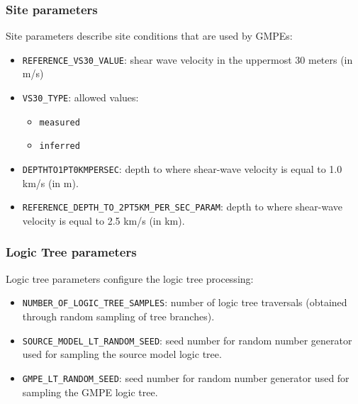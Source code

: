\subsubsection{Site parameters}
Site parameters describe site conditions that are used by GMPEs:
\begin{itemize}
\item \Verb+REFERENCE_VS30_VALUE+: shear wave velocity in the uppermost 30 meters (in m/s)
\item \Verb+VS30_TYPE+: allowed values:
\begin{itemize}
\item \Verb+measured+
\item \Verb+inferred+
\end{itemize}
\item \Verb+DEPTHTO1PT0KMPERSEC+: depth to where shear-wave velocity is equal to 1.0 km/s (in m).
\item \Verb+REFERENCE_DEPTH_TO_2PT5KM_PER_SEC_PARAM+: depth to where shear-wave velocity is equal to 2.5 km/s (in km).
\end{itemize}

\subsubsection{Logic Tree parameters}
Logic tree parameters configure the logic tree processing:
\begin{itemize}
\item \Verb+NUMBER_OF_LOGIC_TREE_SAMPLES+: number of logic tree traversals (obtained through random sampling of tree branches).
\item \Verb+SOURCE_MODEL_LT_RANDOM_SEED+: seed number for random number generator used for sampling the source model logic tree.
\item \Verb+GMPE_LT_RANDOM_SEED+: seed number for random number generator used for sampling the GMPE logic tree.
\end{itemize}

